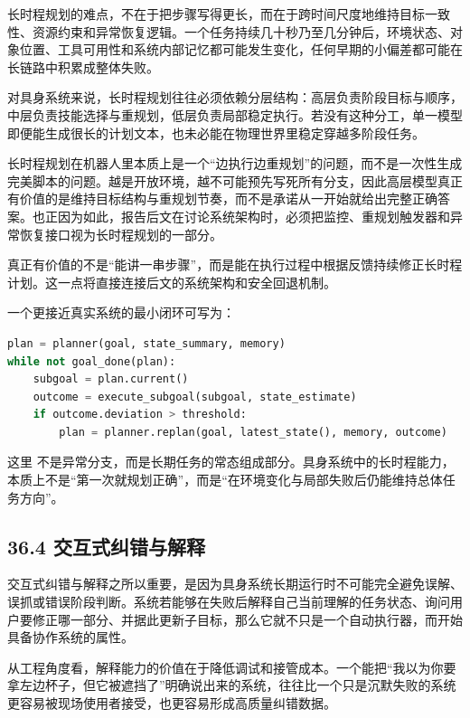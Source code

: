 长时程规划的难点，不在于把步骤写得更长，而在于跨时间尺度地维持目标一致性、资源约束和异常恢复逻辑。一个任务持续几十秒乃至几分钟后，环境状态、对象位置、工具可用性和系统内部记忆都可能发生变化，任何早期的小偏差都可能在长链路中积累成整体失败。

对具身系统来说，长时程规划往往必须依赖分层结构：高层负责阶段目标与顺序，中层负责技能选择与重规划，低层负责局部稳定执行。若没有这种分工，单一模型即便能生成很长的计划文本，也未必能在物理世界里稳定穿越多阶段任务。

长时程规划在机器人里本质上是一个“边执行边重规划”的问题，而不是一次性生成完美脚本的问题。越是开放环境，越不可能预先写死所有分支，因此高层模型真正有价值的是维持目标结构与重规划节奏，而不是承诺从一开始就给出完整正确答案。也正因为如此，报告后文在讨论系统架构时，必须把监控、重规划触发器和异常恢复接口视为长时程规划的一部分。

真正有价值的不是“能讲一串步骤”，而是能在执行过程中根据反馈持续修正长时程计划。这一点将直接连接后文的系统架构和安全回退机制。

一个更接近真实系统的最小闭环可写为：

\begin{lstlisting}[language=python]
plan = planner(goal, state_summary, memory)
while not goal_done(plan):
    subgoal = plan.current()
    outcome = execute_subgoal(subgoal, state_estimate)
    if outcome.deviation > threshold:
        plan = planner.replan(goal, latest_state(), memory, outcome)
\end{lstlisting}

这里 \texttt{} 不是异常分支，而是长期任务的常态组成部分。具身系统中的长时程能力，本质上不是“第一次就规划正确”，而是“在环境变化与局部失败后仍能维持总体任务方向”。

\subsection*{36.4 交互式纠错与解释}


交互式纠错与解释之所以重要，是因为具身系统长期运行时不可能完全避免误解、误抓或错误阶段判断。系统若能够在失败后解释自己当前理解的任务状态、询问用户要修正哪一部分、并据此更新子目标，那么它就不只是一个自动执行器，而开始具备协作系统的属性。

从工程角度看，解释能力的价值在于降低调试和接管成本。一个能把“我以为你要拿左边杯子，但它被遮挡了”明确说出来的系统，往往比一个只是沉默失败的系统更容易被现场使用者接受，也更容易形成高质量纠错数据。

